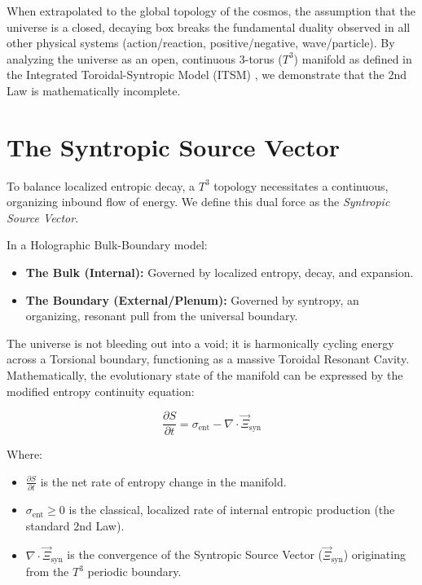 \documentclass[aps,prd,11pt,onecolumn,superscriptaddress,nofootinbib,floatfix]{revtex4-2}
\begin{document}
When extrapolated to the global topology of the cosmos, the assumption that the universe is a closed, decaying box breaks the fundamental duality observed in all other physical systems (action/reaction, positive/negative, wave/particle). By analyzing the universe as an open, continuous 3-torus ($T^3$) manifold as defined in the Integrated Toroidal-Syntropic Model (ITSM) \cite{itsm_main}, we demonstrate that the 2nd Law is mathematically incomplete.

\section{The Syntropic Source Vector}
\label{sec:syntropy}

To balance localized entropic decay, a $T^3$ topology necessitates a continuous, organizing inbound flow of energy. We define this dual force as the \textit{Syntropic Source Vector}. 

In a Holographic Bulk-Boundary model:
\begin{itemize}
    \item \textbf{The Bulk (Internal):} Governed by localized entropy, decay, and expansion.
    \item \textbf{The Boundary (External/Plenum):} Governed by syntropy, an organizing, resonant pull from the universal boundary.
\end{itemize}

The universe is not bleeding out into a void; it is harmonically cycling energy across a Torsional boundary, functioning as a massive Toroidal Resonant Cavity. Mathematically, the evolutionary state of the manifold can be expressed by the modified entropy continuity equation:

\begin{equation}
    \frac{\partial S}{\partial t} = \sigma_{\text{ent}} - \nabla \cdot \vec{\Xi}_{\text{syn}}
\end{equation}

Where:
\begin{itemize}
    \item $\frac{\partial S}{\partial t}$ is the net rate of entropy change in the manifold.
    \item $\sigma_{\text{ent}} \ge 0$ is the classical, localized rate of internal entropic production (the standard 2nd Law).
    \item $\nabla \cdot \vec{\Xi}_{\text{syn}}$ is the convergence of the Syntropic Source Vector ($\vec{\Xi}_{\text{syn}}$) originating from the $T^3$ periodic boundary.
\end{itemize}
\end{document}
